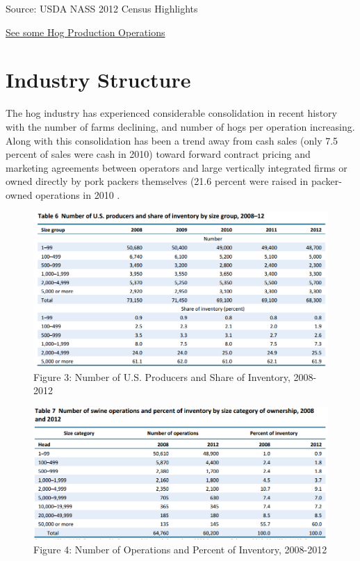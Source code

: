 \documentclass[]{book}
\theoremstyle{definition}
\theoremstyle{definition}
\theoremstyle{remark}
\begin{document}
Source: USDA NASS 2012 Census Highlights \citep{usdacensus}

\href{https://www.google.com/maps/place/Hardin+County,+IA/@42.3833668,-93.3907209,60627m/data=!3m2!1e3!4b1!4m2!3m1!1s0x87ee2ed39f2db5df:0x67a785cf003d5369!6m1!1e1}{See
some Hog Production Operations}

\section{Industry Structure}\label{industry-structure}

The hog industry has experienced considerable consolidation in recent
history with the number of farms declining, and number of hogs per
operation increasing. Along with this consolidation has been a trend
away from cash sales (only 7.5 percent of sales were cash in 2010)
toward forward contract pricing and marketing agreements between
operators and large vertically integrated firms or owned directly by
pork packers themselves (21.6 percent were raised in packer-owned
operations in 2010 \citep{gipsa10}.

\begin{figure}[htbp]
\centering
\includegraphics{images/numberproducersshare.png}
\caption{Figure 3: Number of U.S. Producers and Share of Inventory,
2008-2012}
\end{figure}

\begin{figure}[htbp]
\centering
\includegraphics{images/numberoperations.png}
\caption{Figure 4: Number of Operations and Percent of Inventory,
2008-2012}
\end{figure}
\end{document}
